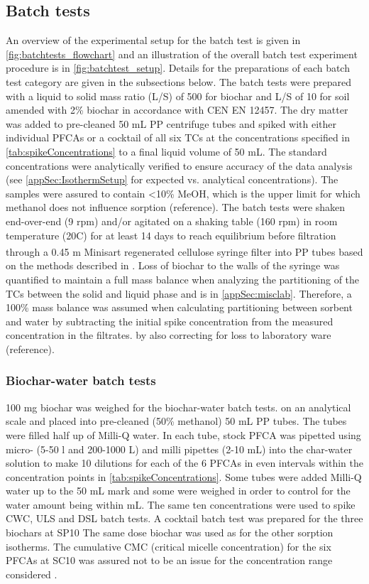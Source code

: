 \subsection{Batch tests}
An overview of the experimental setup for the batch test is given in \cref{fig:batchtests_flowchart} and an illustration of the overall batch test experiment procedure is in \cref{fig:batchtest_setup}. Details for the preparations of each batch test category are given in the subsections below. The batch tests were prepared with a liquid to solid mass ratio (L/S) of 500 for biochar and L/S of 10 for soil amended with 2\% biochar in accordance with CEN EN 12457. The dry matter was added to pre-cleaned 50 mL PP centrifuge tubes and spiked with either individual PFCAs or a cocktail of all six TCs at the concentrations specified in \cref{tab:spikeConcentrations} to a final liquid volume of 50 mL. The standard concentrations were analytically verified to ensure accuracy of the data analysis (see \cref{appSec:IsothermSetup} for expected vs. analytical concentrations). The samples were assured to contain \textless 10\% MeOH, which is the upper limit for which methanol does not influence sorption (reference). The batch tests were shaken end-over-end (9 rpm) and/or agitated on a shaking table (160 rpm) in room temperature (20\textdegree C) for at least 14 days to reach equilibrium \citep{higgins2006sorption} before filtration through a 0.45 \textmu m Minisart\textsuperscript{\textregistered} regenerated cellulose syringe filter into PP tubes based on the methods described in \cite{Sorengard2019}. Loss of biochar to the walls of the syringe was quantified to maintain a full mass balance when analyzing the partitioning of the TCs between the solid and liquid phase and is in \cref{appSec:misclab}. Therefore, a 100\% mass balance was assumed when calculating partitioning between sorbent and water by subtracting the initial spike concentration from the measured concentration in the filtrates. by also correcting for loss to laboratory ware (reference). 

\subsubsection{Biochar-water batch tests}
100 mg biochar was weighed for the biochar-water batch tests. on an analytical scale and placed into pre-cleaned (50\% methanol) 50 mL PP tubes. The tubes were filled half up of Milli-Q water. In each tube, stock PFCA was pipetted using micro- (5-50 {\textmu}l and 200-1000 {\textmu}L) and milli pipettes (2-10 mL) into the char-water solution to make 10 dilutions for each of the 6 PFCAs in even intervals within the concentration points in \cref{tab:spikeConcentrations}. Some tubes were added Milli-Q water up to the 50 mL mark and some were weighed in order to control for the water amount being within  mL. The same ten concentrations were used to spike CWC, ULS and DSL batch tests. A cocktail batch test was prepared for the three biochars at SP10  The same dose biochar was used as for the other sorption isotherms. The cumulative CMC (critical micelle concentration) for the six PFCAs at SC10 was assured not to be an issue for the concentration range considered \citep{bhhatarai2011,ding2013physicochemical}.

